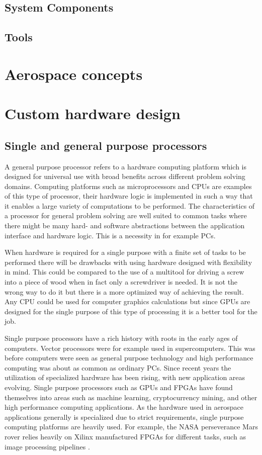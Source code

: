\documentclass[12pt]{report}
\begin{document}
\section{System Components}

\section{Tools}

\chapter{Aerospace concepts}

\chapter{Custom hardware design}
\section{Single and general purpose processors}
A general purpose processor refers to a hardware computing platform which is designed for universal use with broad benefits across different problem solving domains. Computing platforms such as microprocessors and CPUs are examples of this type of processor, their hardware logic is implemented in such a way that it enables a large variety of computations to be performed. 
The characteristics of a processor for general problem solving are well suited to common tasks where there might be many hard- and software abstractions between the application interface and hardware logic. This is a necessity in for example PCs.
\par
When hardware is required for a single purpose with a finite set of tasks to be performed there will be drawbacks with using hardware designed with flexibility in mind. This could be compared to the use of a multitool for driving a screw into a piece of wood when in fact only a screwdriver is needed. It is not the wrong way to do it but there is a more optimized way of achieving the result. Any CPU could be used for computer graphics calculations but since GPUs are designed for the single purpose of this type of processing it is a better tool for the job.
\par
Single purpose processors have a rich history with roots in the early ages of computers. Vector processors were for example used in supercomputers.
This was before computers were seen as general purpose technology and high performance computing was about as common as ordinary PCs.
Since recent years the utilization of specialized hardware has been rising, with new application areas evolving. Single purpose processors such as GPUs and FPGAs have found themselves into areas such as machine learning, cryptocurrency mining, and other high performance computing applications.
As the hardware used in aerospace applications generally is specialized due to strict requirements, single purpose computing platforms are heavily used. For example, the NASA perseverance Mars rover relies heavily on Xilinx manufactured FPGAs for different tasks, such as image processing pipelines \citep{XilPerservance}.
\end{document}
